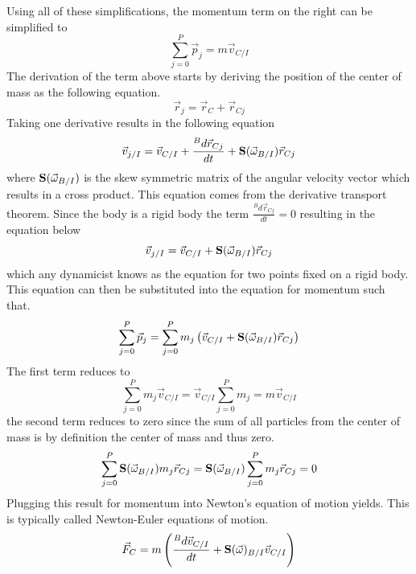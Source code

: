 \documentclass{article}
\begin{document}
Using all of these simplifications, the momentum term on the right can
be simplified to 
\begin{equation}
\sum\limits_{j=0}^P \vec{p}_j = m \vec{v}_{C/I}
\end{equation}
The derivation of the term above starts by deriving the position of
the center of mass as the following equation.
\begin{equation}
\vec{r}_{j} = \vec{r}_C + \vec{r}_{Cj}
\end{equation}
Taking one derivative results in the following equation
\begin{equation}
\vec{v}_{j/I} = \vec{v}_{C/I} + \frac{{}^Bd \vec{r}_{Cj}}{dt} +
{\bf S}(\vec{\omega}_{B/I}) \vec{r}_{Cj}
\end{equation}
where ${\bf S}(\vec{\omega}_{B/I})$ is the skew symmetric matrix of the
angular velocity vector which results in a cross product. This
equation comes from the derivative transport theorem. Since the body
is a rigid body the term $\frac{{}^Bd \vec{r}_{Cj}}{dt}=0$ resulting
in the equation below
\begin{equation}
\vec{v}_{j/I} = \vec{v}_{C/I} + {\bf S}(\vec{\omega}_{B/I}) \vec{r}_{Cj}
\end{equation}
which any dynamicist knows as the equation for two points fixed on a
rigid body. This equation can then be substituted into the equation
for momentum such that.
\begin{equation}
\sum\limits_{j=0}^P \vec{p}_j =  \sum\limits_{j=0}^P m_j \left(\vec{v}_{C/I}
+ {\bf S}(\vec{\omega}_{B/I}) \vec{r}_{Cj}\right)
\end{equation}
The first term reduces to 
\begin{equation}
\sum\limits_{j=0}^P m_j \vec{v}_{C/I} =  \vec{v}_{C/I}
\sum\limits_{j=0}^P m_j =  m \vec{v}_{C/I} 
\end{equation}
the second term reduces to zero since the sum of all particles from
the center of mass is by definition the center of mass and thus zero.
\begin{equation}
\sum\limits_{j=0}^P {\bf S}(\vec{\omega}_{B/I}) m_j\vec{r}_{Cj} =
{\bf S}(\vec{\omega}_{B/I})\sum\limits_{j=0}^P m_j\vec{r}_{Cj} = 0
\end{equation}
Plugging this result for momentum into Newton's equation of motion
yields. This is typically called Newton-Euler equations of motion.
\begin{equation}
\vec{F}_C = m \left(\frac{{}^Bd \vec{v}_{C/I}}{dt} +
{\bf S}(\vec{\omega})_{B/I} \vec{v}_{C/I} \right)
\end{equation}
\end{document}
